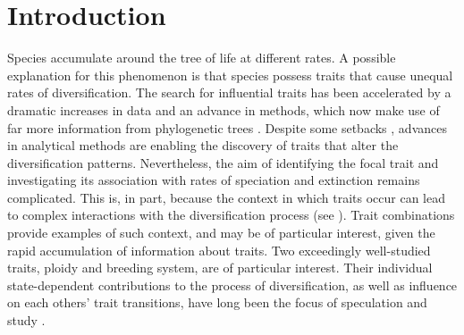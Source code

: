 \section{Introduction}


Species accumulate around the tree of life at different rates.
A possible explanation for this phenomenon is that species possess traits that cause unequal rates of diversification. %
The search for influential traits has been accelerated by a dramatic increases in data and an advance in methods, which now make use of far more information from phylogenetic trees \citep{maddison_2007}. 
Despite some setbacks \citep{maddison_2015, rabosky_2015, moore_2016}, advances in analytical methods \citep{fitzjohn_2009, goldberg_2012, beaulieu_2016, rabosky_2017} are enabling the discovery of traits that alter the diversification patterns. %
Nevertheless, the aim of identifying the focal trait and investigating its association with rates of speciation and extinction remains complicated. 
This is, in part, because the context in which traits occur can lead to complex interactions with the diversification process (see \citet{caetano_2018, herrera_2018}). 
Trait combinations provide examples of such context, and may be of particular interest, given the rapid accumulation of information about traits. %
Two exceedingly well-studied traits, ploidy and breeding system, are of particular interest. 
Their individual state-dependent contributions to the process of diversification, as well as influence on each others' trait transitions, have long been the focus of speculation and study \citep{stebbins1950}.

